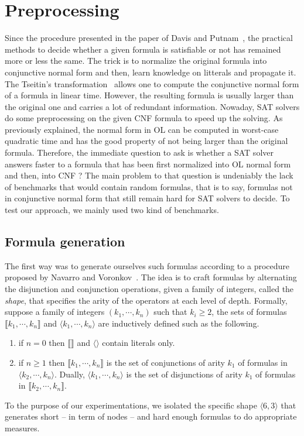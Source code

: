 \documentclass[a4paper, 11pt]{article}
\begin{document}
    \section{Preprocessing}
    Since the procedure presented in the paper of Davis and Putnam~\cite{10.1145/321033.321034}, the
    practical methods to decide whether a given formula is satisfiable or not has remained more or less
    the same. The trick is to normalize the original formula into conjunctive normal form and then,
    learn knowledge on litterals and propagate it. The Tseitin's transformation~\cite{Tseitin1983} 
    allows one to compute
    the conjunctive normal form of a formula in linear time. However, the resulting formula is usually
    larger than the original one and carries a lot of redundant information. Nowaday, SAT solvers do
    some preprocessing on the given CNF formula to speed up the solving. As previously explained, the
    normal form in OL can be computed in worst-case quadratic time and has the good property of not
    being larger than the original formula. Therefore, the immediate question to ask is whether a SAT
    solver answers faster to a formula that has been first normalized into OL normal form and then, into 
    CNF ? The main problem to that question is undeniably the lack of benchmarks that would contain
    random formulas, that is to say, formulas not in conjunctive normal form that still remain hard for
    SAT solvers to decide. To test our approach, we mainly used two kind of benchmarks.
    \subsection{Formula generation}
    The first way was to generate ourselves such formulas according to a procedure
    proposed by Navarro and Voronkov~\cite{11cf478fe9d5463eb66cfafaa9577771}. The idea is to craft
    formulas by alternating the disjunction and conjunction operations, given a family of integers,
    called the \textit{shape}, that specifies the arity of the operators at each level of depth. 
    Formally,
    suppose a family of integers $(k_1,\cdots,k_n)$ such that $k_i\ge 2$, the sets of formulas
    $\llbracket k_1,\cdots,k_n\rrbracket$ and $\langle k_1,\cdots,k_n\rangle$ are inductively defined
    such as the following.
    \begin{enumerate}
	    \item
		if $n=0$ then $\llbracket\rrbracket$ and $\langle\rangle$ contain literals only.
	\item
		if $n\ge 1$ then $\llbracket k_1,\cdots,k_n\rrbracket$ is the set of conjunctions
		    of arity $k_1$ of formulas in $\langle k_2,\cdots,k_n\rangle$. Dually,
		    $\langle k_1,\cdots,k_n\rangle$ is the set of disjunctions of arity $k_1$ of
		    formulas in $\llbracket k_2,\cdots,k_n\rrbracket$.
    \end{enumerate}
    To the purpose of our experimentations, we isolated the specific shape $\langle 6,3\rangle$ that
    generates short -- in term of nodes -- and hard enough formulas to do appropriate measures.
\end{document}
